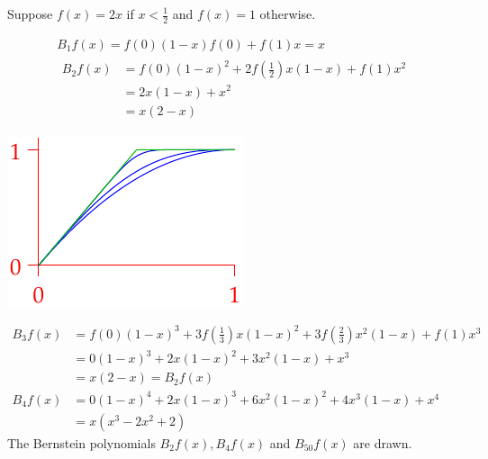 \begin{examples}{}{}
\exstart Suppose $f(x)=2x$ if $x<\frac 12$ and $f(x)=1$ otherwise.
  
\begin{enumerate}\setcounter{enumi}{1}
 	\begin{minipage}[t]{0.6\linewidth}\vspace{-20pt}
		\item[]\begin{gather*}
  B_1f(x)=f(0)(1-x)f(0)+f(1)x=x\\[6pt]
  \begin{aligned}
  B_2f(x)&=f(0)(1-x)^2+2f(\tfrac 12)x(1-x)+f(1)x^2\\
  &=2x(1-x)+x^2\\
  &=x(2-x)
  \end{aligned}
  \end{gather*}
	\end{minipage}\begin{minipage}[t]{0.4\linewidth}\vspace{-25pt}
		\flushright\includegraphics[scale=1]{bernstein}
	\end{minipage}\vspace{-8pt}
	
  \begin{align*}
  B_3f(x)&=f(0)(1-x)^3+3f(\tfrac 13)x(1-x)^2+3f(\tfrac 23)x^2(1-x)+f(1)x^3\\
  &= 0(1-x)^3+ 2x(1-x)^2+3x^2(1-x)+x^3\\
  &=x(2-x)=B_2f(x)\\[5pt]
  B_4f(x)&=0(1-x)^4+2x(1-x)^3+ 6x^2(1-x)^2 +4x^3(1-x)+x^4\\
  &=x(x^3-2x^2+2)
	\end{align*}
	The Bernstein polynomials $B_2f(x), B_4f(x)$ and $B_{50}f(x)$ are drawn.
	

\end{enumerate}
\end{examples}
